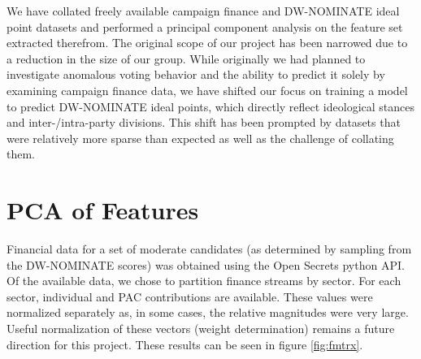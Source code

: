 \documentclass[10]{article}
\begin{document}
We have collated freely available campaign finance and DW-NOMINATE ideal point \cite{DWWEB} datasets and performed a principal component analysis on the feature set extracted therefrom. The original scope of our project has been narrowed due to a reduction in the size of our group. While originally we had planned to investigate anomalous voting behavior and the ability to predict it solely by examining campaign finance data, we have shifted our focus on training a model to predict DW-NOMINATE ideal points, which directly reflect ideological stances and inter-/intra-party divisions. This shift has been prompted by datasets that were relatively more sparse than expected as well as the challenge of collating them.\\

\section*{PCA of Features}
Financial data for a set of moderate candidates (as determined by sampling from the DW-NOMINATE scores) was obtained using the Open Secrets python API.  Of the available data, we chose to partition finance streams by sector.  For each sector, individual and PAC contributions are available.  These values were normalized separately as, in some cases, the relative magnitudes were very large.  Useful normalization of these vectors (weight determination) remains a future direction for this project.  These results can be seen in figure \ref{fig:fmtrx}.
\end{document}
